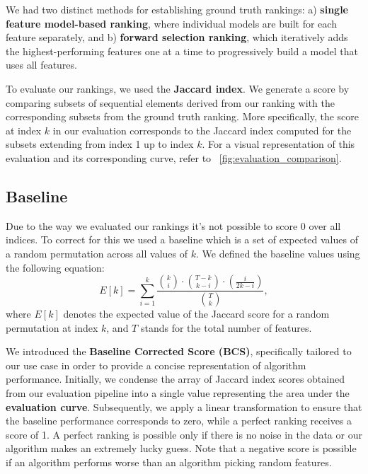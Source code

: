 \documentclass[fleqn,moreauthors,10pt]{ds_report}
\begin{document}
We had two distinct methods for establishing ground truth rankings: a) \textbf{single feature model-based ranking}, where individual models are built for each feature separately, and b) \textbf{forward selection ranking}, which iteratively adds the highest-performing features one at a time to progressively build a model that uses all features.

To evaluate our rankings, we used the \textbf{Jaccard index}. We generate a score by comparing subsets of sequential elements derived from our ranking with the corresponding subsets from the ground truth ranking. More specifically, the score at index $k$ in our evaluation corresponds to the Jaccard index computed for the subsets extending from index 1 up to index $k$. For a visual representation of this evaluation and its corresponding curve, refer to \figurename~\ref{fig:evaluation_comparison}.
 

\subsection*{Baseline}

Due to the way we evaluated our rankings it's not possible to score 0 over all indices. To correct for this we used a baseline which is a set of expected values of a random permutation across all values of $k$. We defined the baseline values using the following equation:
\begin{equation}
    E[k] = \sum_{i=1}^{k} \frac{\binom{k}{i} \cdot \binom{T-k}{k-i} \cdot \left(\frac{i}{2k-i}\right)}{\binom{T}{k}} \label{eq:baseline},
\end{equation}
where $E[k]$ denotes the expected value of the Jaccard score for a random permutation at index $k$, and $T$ stands for the total number of features.

We introduced the \textbf{Baseline Corrected Score (BCS)}, specifically tailored to our use case in order to provide a concise representation of algorithm performance. Initially, we condense the array of Jaccard index scores obtained from our evaluation pipeline into a single value representing the area under the \textbf{evaluation curve}. Subsequently, we apply a linear transformation to ensure that the baseline performance corresponds to zero, while a perfect ranking receives a score of 1. A perfect ranking is possible only if there is no noise in the data or our algorithm makes an extremely lucky guess. Note that a negative score is possible if an algorithm performs worse than an algorithm picking random features.
\end{document}
